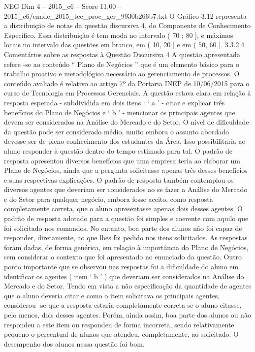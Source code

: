 \begin{textsample}{NEG Dim 4 – 2015\_c6 – Score 11.00 – 2015\_c6/enade\_2015\_tec\_proc\_ger\_9930b266b7.txt}
O Gráfico 3.12 representa a distribuição de notas da questão discursiva 4, do Componente de Conhecimento Específico.
Essa distribuição é tem moda no intervalo ( 70 ; 80 ], e máximos locais no intervalo das questões em branco, em ( 10, 20 ] e em ( 50, 60 ]. 3.3.2.4 Comentários sobre as respostas à Questão Discursiva 4 A questão apresentada refere -se ao conteúdo “ Plano de Negócios ” que é um elemento básico para o trabalho proativo e metodológico necessário ao gerenciamento de processos.
O conteúdo avaliado é relativo ao artigo 7º da Portaria INEP de 10/06/2015 para o curso de Tecnologia em Processos Gerenciais.
A questão estava clara em relação à resposta esperada - subdividida em dois itens : ‘ a ’ - citar e explicar três benefícios do Plano de Negócios e ‘ b ’ - mencionar os principais agentes que devem ser considerados na Análise do Mercado e do Setor.
O nível de dificuldade da questão pode ser considerado médio, muito embora o assunto abordado devesse ser de pleno conhecimento dos estudantes da Área.
Isso possibilitaria ao aluno responder à questão dentro do tempo estimado para tal.
O padrão de resposta apresentou diversos benefícios que uma empresa teria ao elaborar um Plano de Negócios, ainda que a pergunta solicitasse apenas três desses benefícios e suas respectivas explicações.
O padrão de resposta também contemplou os diversos agentes que deveriam ser considerados ao se fazer a Análise do Mercado e do Setor para qualquer negócio, embora fosse aceito, como resposta completamente correta, que o aluno apresentasse apenas dois desses agentes.
O padrão de resposta adotado para a questão foi simples e coerente com aquilo que foi solicitado nos comandos.
No entanto, boa parte dos alunos não foi capaz de responder, diretamente, ao que lhes foi pedido nos itens solicitados.
As respostas foram dadas, de forma genérica, em relação à importância do Plano de Negócios, sem considerar o contexto que foi apresentado no enunciado da questão.
Outro ponto importante que se observou nas respostas foi a dificuldade do aluno em identificar os agentes ( item ‘ b ’ ) que deveriam ser considerados na Análise do Mercado e do Setor.
Tendo em vista a não especificação da quantidade de agentes que o aluno deveria citar e como o item solicitava os principais agentes, considerou -se que a resposta estaria completamente correta se o aluno citasse, pelo menos, dois desses agentes.
Porém, ainda assim, boa parte dos alunos ou não respondeu a este item ou respondeu de forma incorreta, sendo relativamente pequeno o percentual de alunos que atendeu, completamente, ao solicitado.
O desempenho dos alunos nessa questão foi bom.

\end{textsample}

